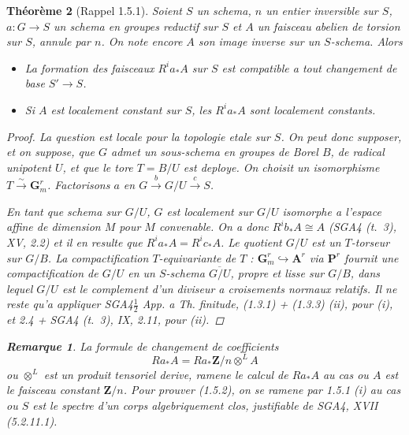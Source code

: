 \documentclass[11pt,a4paper]{article}
\theoremstyle{plain}
\newtheorem{theorem}{Th\'eor\`eme}[section]
\theoremstyle{definition}
\newtheorem{remark}[theorem]{Remarque}
\begin{document}
\begin{theorem}[Rappel 1.5.1]\label{1.5.1}
Soient $S$ un schema, $n$ un entier inversible sur $S$, $a : G \to S$ un schema en groupes reductif sur $S$ et $A$ un faisceau abelien de torsion sur $S$, annule par $n$. On note encore $A$ son image inverse sur un $S$-schema. Alors
\begin{itemize}
\item[(i)] La formation des faisceaux $R^i a_* A$ sur $S$ est compatible a tout changement de base $S' \to S$.
\item[(ii)] Si $A$ est localement constant sur $S$, les $R^i a_* A$ sont localement constants.
\end{itemize}

\begin{proof}
La question est locale pour la topologie etale sur $S$. On peut donc supposer, et on suppose, que $G$ admet un sous-schema en groupes de Borel $B$, de radical unipotent $U$, et que le tore $T = B/U$ est deploye. On choisit un isomorphisme $T \xrightarrow{\sim} \mathbf{G}_m^r$. Factorisons $a$ en $G \xrightarrow{b} G/U \xrightarrow{c} S$.

En tant que schema sur $G/U$, $G$ est localement sur $G/U$ isomorphe a l'espace affine de dimension $M$ pour $M$ convenable. On a donc $R^i b_* A \cong A$ (SGA4 (t.~3), XV, 2.2) et il en resulte que $R^i a_* A = R^i c_* A$. Le quotient $G/U$ est un $T$-torseur sur $G/B$. La compactification $T$-equivariante de $T$ : $\mathbf{G}_m^r \hookrightarrow \mathbf{A}^r$ via $\mathbf{P}^r$ fournit une compactification de $G/U$ en un $S$-schema $\overline{G/U}$, propre et lisse sur $G/B$, dans lequel $G/U$ est le complement d'un diviseur a croisements normaux relatifs. Il ne reste qu'a appliquer SGA4$\frac{1}{2}$ App. a Th. finitude, (1.3.1) + (1.3.3) (ii), pour (i), et 2.4 + SGA4 (t.~3), IX, 2.11, pour (ii).
\end{proof}

\begin{remark}
La formule de changement de coefficients
\begin{equation}\label{1.5.2}
R a_* A = R a_* \mathbf{Z}/n \otimes^L A
\end{equation}
ou $\otimes^L$ est un produit tensoriel derive, ramene le calcul de $R a_* A$ au cas ou $A$ est le faisceau constant $\mathbf{Z}/n$. Pour prouver (1.5.2), on se ramene par 1.5.1 (i) au cas ou $S$ est le spectre d'un corps algebriquement clos, justifiable de SGA4, XVII (5.2.11.1).
\end{remark}


\end{theorem}
\end{document}
